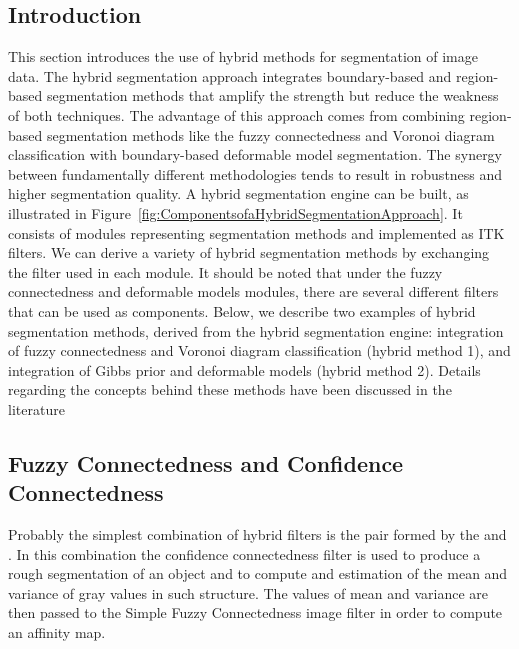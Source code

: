 %
%
% 
%
%
%


\subsection{Introduction}
\label{sec:HybridSegmentationIntroduction}
This section introduces the use of hybrid methods for segmentation of image
data. The hybrid segmentation approach integrates boundary-based and
region-based segmentation methods that amplify the strength but reduce the
weakness of both techniques. The advantage of this approach comes from
combining region-based segmentation methods like the fuzzy connectedness and
Voronoi diagram classification with boundary-based deformable model
segmentation. The synergy between fundamentally different methodologies tends
to result in robustness and higher segmentation quality.  A hybrid
segmentation engine can be built, as illustrated in
Figure~\ref{fig:ComponentsofaHybridSegmentationApproach}. It consists of
modules representing segmentation methods and implemented as ITK filters. We
can derive a variety of hybrid segmentation methods by exchanging the filter
used in each module. It should be noted that under the fuzzy connectedness
and deformable models modules, there are several different filters that can
be used as components. Below, we describe two examples of hybrid segmentation
methods, derived from the hybrid segmentation engine: integration of fuzzy
connectedness and Voronoi diagram classification (hybrid method 1), and
integration of Gibbs prior and deformable models (hybrid method 2).  Details
regarding the concepts behind these methods have been discussed in the
literature
\cite{Angelini2002,Udupa2002,Jin2002,Imielinska2001,Imielinska2000a,Imielinska2000b}


\subsection{Fuzzy Connectedness and Confidence Connectedness }

Probably the simplest combination of hybrid filters is the pair formed by the
 and
. In this combination the
confidence connectedness filter is used to produce a rough segmentation of an
object and to compute and estimation of the mean and variance of
gray values in such structure. The values of mean and variance are then passed
to the Simple Fuzzy Connectedness image filter in order to compute an affinity map.

